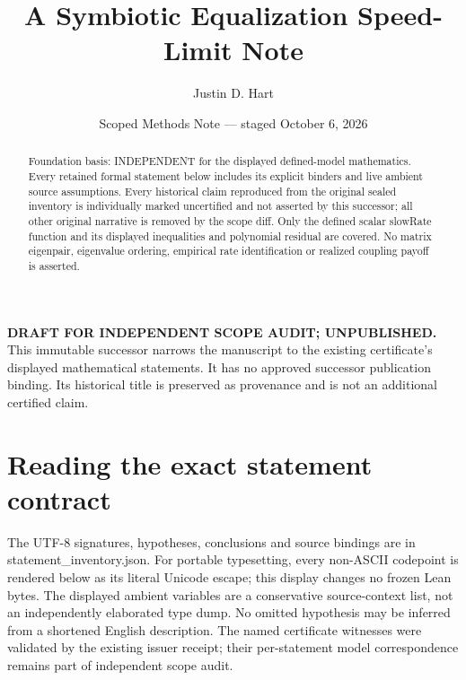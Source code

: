 \documentclass[11pt]{article}
\title{A Symbiotic Equalization Speed-Limit Note}
\author{Justin D. Hart}
\date{Scoped Methods Note --- staged October 6, 2026}
\begin{document}
\maketitle
\noindent\textbf{DRAFT FOR INDEPENDENT SCOPE AUDIT; UNPUBLISHED.} This immutable successor narrows the manuscript to the existing certificate's displayed mathematical statements. It has no approved successor publication binding. Its historical title is preserved as provenance and is not an additional certified claim.
\begin{abstract}
Foundation basis: INDEPENDENT for the displayed defined-model mathematics. Every retained formal statement below includes its explicit binders and live ambient source assumptions. Every historical claim reproduced from the original sealed inventory is individually marked uncertified and not asserted by this successor; all other original narrative is removed by the scope diff. Only the defined scalar slowRate function and its displayed inequalities and polynomial residual are covered. No matrix eigenpair, eigenvalue ordering, empirical rate identification or realized coupling payoff is asserted.
\end{abstract}
\section*{Reading the exact statement contract}
The UTF-8 signatures, hypotheses, conclusions and source bindings are in statement\_inventory.json. For portable typesetting, every non-ASCII codepoint is rendered below as its literal Unicode escape; this display changes no frozen Lean bytes. The displayed ambient variables are a conservative source-context list, not an independently elaborated type dump. No omitted hypothesis may be inferred from a shortened English description. The named certificate witnesses were validated by the existing issuer receipt; their per-statement model correspondence remains part of independent scope audit.
\end{document}
